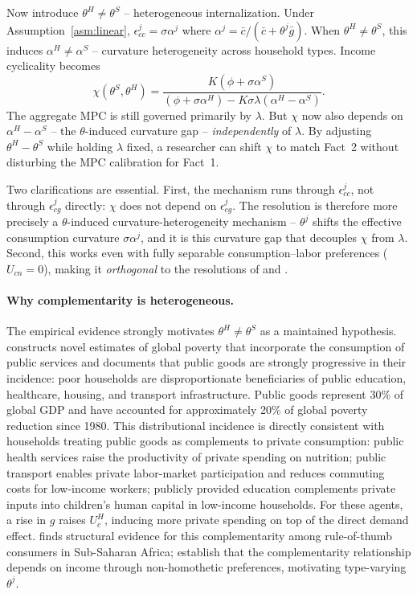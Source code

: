 \smallskip
Now introduce $\theta^{H}\neq\theta^{S}$ -- heterogeneous internalization. Under
Assumption~\ref{asm:linear}, $\epsilon^{j}_{cc}=\sigma\alpha^{j}$ where
$\alpha^{j}=\bar c/(\bar c+\theta^{j}\bar g)$. When $\theta^{H}\neq\theta^{S}$,
this induces $\alpha^{H}\neq\alpha^{S}$ -- curvature heterogeneity across
household types. Income cyclicality becomes
\[
  \chi(\theta^{S},\theta^{H})=
  \frac{K(\phi+\sigma\alpha^{S})}
       {(\phi+\sigma\alpha^{H}) - K\sigma\lambda(\alpha^{H}-\alpha^{S})}.
\]
The aggregate MPC is still governed primarily by $\lambda$. But $\chi$ now also
depends on $\alpha^{H}-\alpha^{S}$ -- the $\theta$-induced curvature gap --
\emph{independently} of $\lambda$. By adjusting $\theta^{H}-\theta^{S}$ while
holding $\lambda$ fixed, a researcher can shift $\chi$ to match Fact~2 without
disturbing the MPC calibration for Fact~1.

\smallskip
Two clarifications are essential. First, the mechanism runs through
$\epsilon^{j}_{cc}$, not through $\epsilon^{j}_{cg}$ directly: $\chi$ does not
depend on $\epsilon^{j}_{cg}$. The resolution is therefore more precisely a
$\theta$-induced curvature-heterogeneity mechanism -- $\theta^{j}$ shifts the
effective consumption curvature $\sigma\alpha^{j}$, and it is this curvature gap
that decouples $\chi$ from $\lambda$. Second, this works even with fully
separable consumption--labor preferences ($U_{cn}=0$), making it
\emph{orthogonal} to the resolutions of \auclert{} and \BHL{}.

\paragraph{Why complementarity is heterogeneous.}
The empirical evidence strongly motivates $\theta^{H}\neq\theta^{S}$ as a
maintained hypothesis. \citet{Gethin2023} constructs novel estimates of global
poverty that incorporate the consumption of public services and documents that
public goods are strongly progressive in their incidence: poor households are
disproportionate beneficiaries of public education, healthcare, housing, and
transport infrastructure. Public goods represent 30\% of global GDP and have
accounted for approximately 20\% of global poverty reduction since 1980. This
distributional incidence is directly consistent with \HtM{} households treating
public goods as complements to private consumption: public health services raise
the productivity of private spending on nutrition; public transport enables
private labor-market participation and reduces commuting costs for low-income
workers; publicly provided education complements private inputs into children's
human capital in low-income households. For these agents, a rise in $g$ raises
$U^{H}_{c}$, inducing more private spending on top of the direct demand effect.
\citet{Francois2023} finds structural evidence for this complementarity among
rule-of-thumb consumers in Sub-Saharan Africa; \citet{BarthelFrancois2025}
establish that the complementarity relationship depends on income through
non-homothetic preferences, motivating type-varying $\theta^{j}$.

